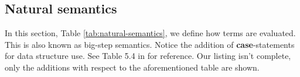 \documentclass[a4paper]{article}
\begin{document}


\subsection{Natural semantics}

In this section, Table \ref{tab:natural-semantics}, we define how terms are
evaluated. This is also known as big-step semantics. Notice the addition of
\textbf{case}-statements for data structure use. See Table 5.4 in \cite{nnh}
for reference. Our listing isn't complete, only the additions with respect to the 
aforementioned table are shown. 
\end{document}
